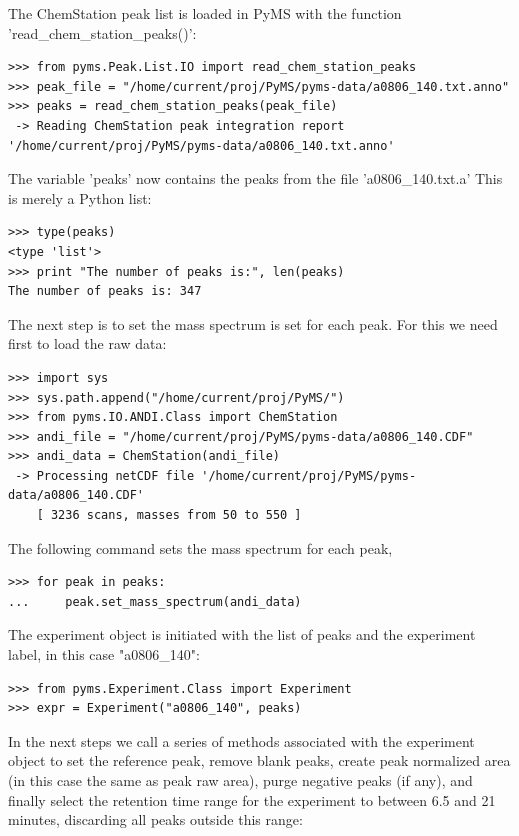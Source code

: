 The ChemStation peak list is loaded in PyMS with the function
'read\_chem\_station\_peaks()':

\begin{verbatim}
>>> from pyms.Peak.List.IO import read_chem_station_peaks
>>> peak_file = "/home/current/proj/PyMS/pyms-data/a0806_140.txt.anno"
>>> peaks = read_chem_station_peaks(peak_file)
 -> Reading ChemStation peak integration report
'/home/current/proj/PyMS/pyms-data/a0806_140.txt.anno'
\end{verbatim}

\noindent
The variable 'peaks' now contains the peaks from the file 'a0806\_140.txt.a'
This is merely a Python list:

\begin{verbatim}
>>> type(peaks)
<type 'list'>
>>> print "The number of peaks is:", len(peaks)
The number of peaks is: 347
\end{verbatim}

The next step is to set the mass spectrum is set for each peak. For this we need
first to load the raw data:

\begin{verbatim}
>>> import sys
>>> sys.path.append("/home/current/proj/PyMS/")
>>> from pyms.IO.ANDI.Class import ChemStation
>>> andi_file = "/home/current/proj/PyMS/pyms-data/a0806_140.CDF"
>>> andi_data = ChemStation(andi_file)
 -> Processing netCDF file '/home/current/proj/PyMS/pyms-data/a0806_140.CDF'
    [ 3236 scans, masses from 50 to 550 ]
\end{verbatim}

\noindent
The following command sets the mass spectrum for each peak,

\begin{verbatim}
>>> for peak in peaks:
...     peak.set_mass_spectrum(andi_data)
\end{verbatim}

The experiment object is initiated with the list of peaks and the experiment
label, in this case "a0806\_140":

\begin{verbatim}
>>> from pyms.Experiment.Class import Experiment
>>> expr = Experiment("a0806_140", peaks)
\end{verbatim}

\noindent
In the next steps we call a series of methods associated with the experiment
object to set the reference peak, remove blank peaks, create peak normalized
area (in this case the same as peak raw area), purge negative peaks (if
any), and finally select the retention time range for the experiment to
between 6.5 and 21 minutes, discarding all peaks outside this range:

